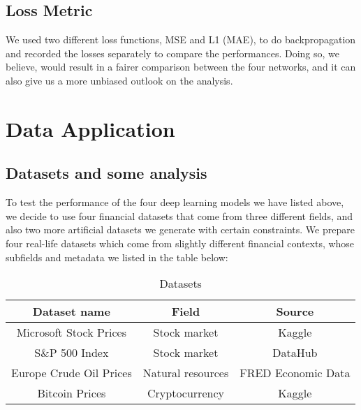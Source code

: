 \documentclass[letterpaper, 10 pt, conference]{ieeeconf}  %
\begin{document}
    \subsection{Loss Metric}
        We used two different loss functions, MSE and L1 (MAE), to do backpropagation and recorded the losses separately to compare the performances. Doing so, we believe, would result in a fairer comparison between the four networks, and it can also give us a more unbiased outlook on the analysis.

\section{Data Application}
    \subsection{Datasets and some analysis}
    To test the performance of the four deep learning models we have listed above, we decide to use four financial datasets that come from three different fields, and also two more artificial datasets we generate with certain constraints. We prepare four real-life datasets which come from slightly different financial contexts, whose subfields and metadata we listed in the table below:

        \begin{table}[h!] \centering
            \caption{Datasets }
            \begin{threeparttable}
                    \begin{tabular}{|c||c|c|}
                        \hline
                        Dataset name & Field & Source\\
                        \hline
                        Microsoft Stock Prices & Stock market & Kaggle\tablefootnote{\url{https://www.kaggle.com/vijayvvenkitesh/microsoft-stock-time-series-analysis}}\\
                        S\&P 500 Index & Stock market & DataHub\tablefootnote{\url{https://datahub.io/core/s-and-p-500}}\\
                        Europe Crude Oil Prices & Natural resources & FRED Economic Data\tablefootnote{\url{https://fred.stlouisfed.org/series/DCOILBRENTEU}}\\
                        Bitcoin Prices & Cryptocurrency & Kaggle\tablefootnote{\url{https://www.kaggle.com/sudalairajkumar/cryptocurrencypricehistory}}\\
                        \hline
                    \end{tabular}
            \end{threeparttable}
        \end{table}
\end{document}
